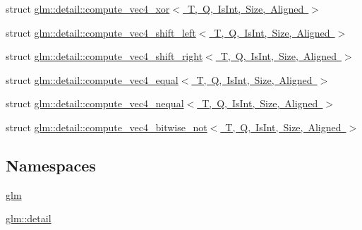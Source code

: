\begin{DoxyCompactItemize}
\item 
struct \mbox{\hyperlink{structglm_1_1detail_1_1compute__vec4__xor}{glm\+::detail\+::compute\+\_\+vec4\+\_\+xor$<$ T, Q, Is\+Int, Size, Aligned $>$}}
\item 
struct \mbox{\hyperlink{structglm_1_1detail_1_1compute__vec4__shift__left}{glm\+::detail\+::compute\+\_\+vec4\+\_\+shift\+\_\+left$<$ T, Q, Is\+Int, Size, Aligned $>$}}
\item 
struct \mbox{\hyperlink{structglm_1_1detail_1_1compute__vec4__shift__right}{glm\+::detail\+::compute\+\_\+vec4\+\_\+shift\+\_\+right$<$ T, Q, Is\+Int, Size, Aligned $>$}}
\item 
struct \mbox{\hyperlink{structglm_1_1detail_1_1compute__vec4__equal}{glm\+::detail\+::compute\+\_\+vec4\+\_\+equal$<$ T, Q, Is\+Int, Size, Aligned $>$}}
\item 
struct \mbox{\hyperlink{structglm_1_1detail_1_1compute__vec4__nequal}{glm\+::detail\+::compute\+\_\+vec4\+\_\+nequal$<$ T, Q, Is\+Int, Size, Aligned $>$}}
\item 
struct \mbox{\hyperlink{structglm_1_1detail_1_1compute__vec4__bitwise__not}{glm\+::detail\+::compute\+\_\+vec4\+\_\+bitwise\+\_\+not$<$ T, Q, Is\+Int, Size, Aligned $>$}}
\end{DoxyCompactItemize}
\subsection*{Namespaces}
\begin{DoxyCompactItemize}
\item 
 \mbox{\hyperlink{namespaceglm}{glm}}
\item 
 \mbox{\hyperlink{namespaceglm_1_1detail}{glm\+::detail}}
\end{DoxyCompactItemize}
